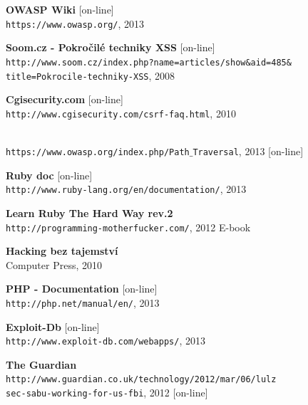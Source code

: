 \documentclass[12pt, a4paper]{report}
\begin{document}
\begin{thebibliography}{9}
	{\bf OWASP Wiki} [on-line] \\
	\texttt{https://www.owasp.org/}, 2013

	{\bf Soom.cz - Pokročilé techniky XSS} [on-line]\\
	\texttt{http://www.soom.cz/index.php?name=articles/show\&aid=485\&\\title=Pokrocile-techniky-XSS}, 2008

	{\bf Cgisecurity.com} [on-line]\\
	\texttt{http://www.cgisecurity.com/csrf-faq.html}, 2010

\\
	\texttt{https://www.owasp.org/index.php/Path$\_$Traversal}, 2013 [on-line]

	{\bf Ruby doc} [on-line]\\
	\texttt{http://www.ruby-lang.org/en/documentation/}, 2013

 {\bf Learn Ruby The Hard Way rev.2}\\
	\texttt{http://programming-motherfucker.com/}, 2012 E-book

               {\bf Hacking bez tajemství} \\
           	Computer Press, 2010

	{\bf PHP - Documentation} [on-line]\\
	\texttt{http://php.net/manual/en/}, 2013

	{\bf Exploit-Db} [on-line]\\
	\texttt{http://www.exploit-db.com/webapps/}, 2013

 {\bf The Guardian}\\
	\texttt{http://www.guardian.co.uk/technology/2012/mar/06/lulz\\sec-sabu-working-for-us-fbi}, 2012 [on-line]


\end{thebibliography}
\end{document}

